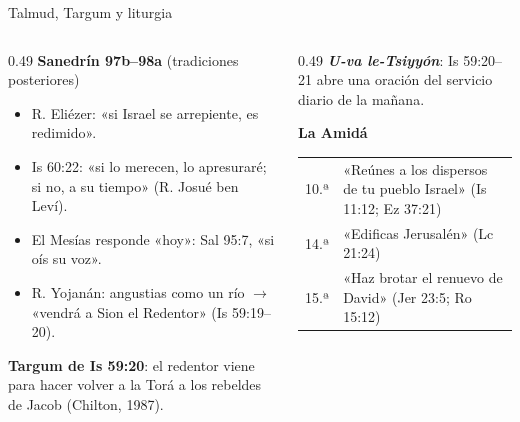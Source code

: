 \begin{frame}{Talmud, Targum y liturgia}
\begin{columns}[T,onlytextwidth]
\begin{column}{0.49\textwidth}\scriptsize\RaggedRight
\textbf{\textcolor{ladrillo}{Sanedrín 97b--98a}} (tradiciones posteriores)
\begin{itemize}
\item R. Eliézer: «si Israel se arrepiente, es redimido».
\item Is 60:22: «si lo merecen, lo apresuraré; si no, a su tiempo» (R. Josué ben Leví).
\item El Mesías responde «hoy»: Sal 95:7, «si oís su voz».
\item R. Yojanán: angustias como un río $\to$ «vendrá a Sion el Redentor» (Is 59:19--20).
\end{itemize}
\textbf{\textcolor{ladrillo}{Targum de Is 59:20}}: el redentor viene para hacer volver a la Torá a los rebeldes de Jacob (Chilton, 1987).
\end{column}
\begin{column}{0.49\textwidth}\scriptsize\RaggedRight
\textbf{\textcolor{ladrillo}{\emph{U-va le-Tsiyyón}}}: Is 59:20--21 abre una oración del servicio diario de la mañana.\par\smallskip
\textbf{\textcolor{ladrillo}{La Amidá}}\par\smallskip
\renewcommand{\arraystretch}{1.2}
\begin{tabular}{>{\RaggedRight\arraybackslash}p{1.3cm}>{\RaggedRight\arraybackslash}p{3.6cm}}
\toprule
10.ª & «Reúnes a los dispersos de tu pueblo Israel» (Is 11:12; Ez 37:21)\\
14.ª & «Edificas Jerusalén» (Lc 21:24)\\
15.ª & «Haz brotar el renuevo de David» (Jer 23:5; Ro 15:12)\\
\bottomrule
\end{tabular}\par
{}
\end{column}
\end{columns}
\end{frame}

